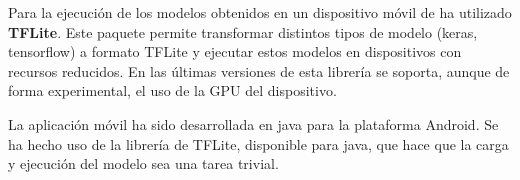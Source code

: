Para la ejecución de los modelos obtenidos en un dispositivo móvil de ha utilizado \textbf{TFLite}. Este paquete permite transformar distintos tipos de modelo (keras, tensorflow) a formato TFLite y ejecutar estos modelos en dispositivos con recursos reducidos. En las últimas versiones de esta librería se soporta, aunque de forma experimental, el uso de la GPU del dispositivo.

La aplicación móvil ha sido desarrollada en java para la plataforma Android. Se ha hecho uso de la librería de TFLite, disponible para java, que hace que la carga y ejecución del modelo sea una tarea trivial.